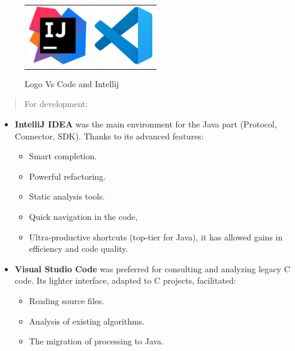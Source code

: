 \documentclass[12pt,a4paper]{report}
\begin{document}
\begin{figure}[H]
\centering
\begin{tabular}{@{}c@{}c@{}}
\includegraphics[width=1in,height=1in]{media/image92.png} &
\includegraphics[width=1in,height=1in]{media/vscode.png}
\end{tabular}
\caption{Logo Vs Code and Intellij}
\label{fig:Vscode-Intellij}
\end{figure}


\begin{quote}
For development:
\end{quote}

\begin{itemize}
\item
  \textbf{IntelliJ IDEA} was the main environment for the Java part
  (Protocol, Connector, SDK). Thanks to its advanced features:

  \begin{itemize}
  \item
    Smart completion.
  \item
    Powerful refactoring.
    
  \item
    Static analysis tools.
  \item
    Quick navigation in the code,
  \item
    Ultra-productive shortcuts (top-tier for Java), it has allowed gains in efficiency and code quality.
  \end{itemize}
\item
  \textbf{Visual Studio Code} was preferred for consulting and analyzing
  legacy C code. Its lighter interface, adapted to C projects,
  facilitated:

  \begin{itemize}
  \item
    Reading source files.
  \item
    Analysis of existing algorithms.
  \item
    The migration of processing to Java.
  \end{itemize}
\end{itemize}
\end{document}
